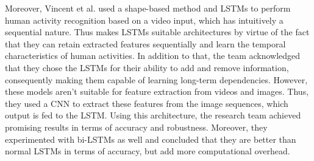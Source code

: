 		Moreover, Vincent et al. used a shape-based method and LSTMs to perform human activity recognition based on a video input, which has intuitively a sequential nature. Thus makes LSTMs suitable architectures by virtue of the fact that they can retain extracted features sequentially and learn the temporal characteristics of human activities. In addition to that, the team acknowledged that they chose the LSTMs for their ability to add and remove information, consequently making them capable of learning long-term dependencies. However, these models aren't suitable for feature extraction from videos and images. Thus, they used a CNN to extract these features from the image sequences, which output is fed to the LSTM. Using this architecture, the research team achieved promising results in terms of accuracy and robustness. Moreover, they experimented with bi-LSTMs as well and concluded that they are better than normal LSTMs in terms of accuracy, but add more computational overhead\cite{vincent2020human}.\newline
